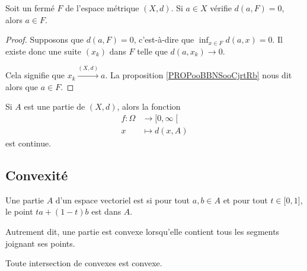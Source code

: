 \begin{lemma}        \label{LEMooEQIZooLpsbOe}
	Soit un fermé \( F\) de l'espace métrique \( (X,d)\). Si \( a\in X\) vérifie \( d(a,F)=0\), alors \( a\in F\).
\end{lemma}

\begin{proof}
	Supposons que \( d(a,F)=0\), c'est-à-dire que \( \inf_{x\in F} d(a,x) =0\). Il existe donc une suite \( (x_k)\) dans \( F\) telle que \( d(a,x_k)\to 0\).

	Cela signifie que \( x_k\stackrel{(X,d)}{\longrightarrow}a\). La proposition \ref{PROPooBBNSooCjrtRb} nous dit alors que \( a\in F\).
\end{proof}


\begin{lemma}        \label{LEMooCFGTooIfdcfk}
	Si \( A\) est une partie de \( (X,d)\), alors la fonction
	\begin{equation}
		\begin{aligned}
			f\colon \Omega & \to \mathopen[ 0 , \infty \mathclose[ \\
			x              & \mapsto d(x,A)
		\end{aligned}
	\end{equation}
	est continue.
\end{lemma}

\subsection{Convexité}

\begin{definition}        \label{DEFooQQEOooAFKbcQ}
	Une partie \( A\) d'un espace vectoriel est  si pour tout \( a,b\in A\) et pour tout \( t\in \mathopen[ 0 , 1 \mathclose]\), le point \( ta+(1-t)b\) est dans \( A\).

	Autrement dit, une partie est convexe lorsqu'elle contient tous les segments joignant ses points.
\end{definition}

\begin{proposition} \label{PROPooJOCEooUKhkqQ}
	Toute intersection de convexes est convexe.
\end{proposition}

